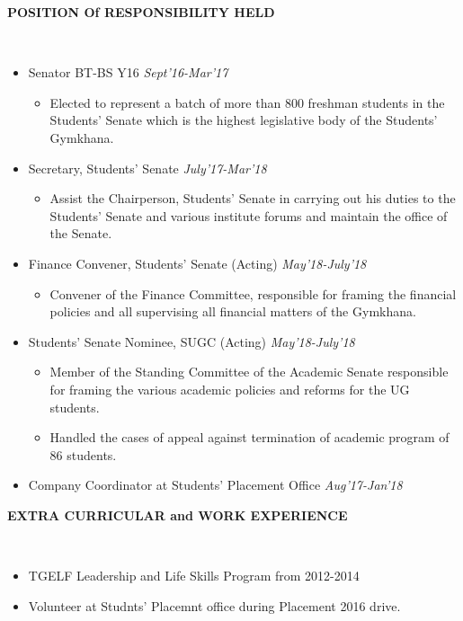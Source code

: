 \documentclass{article}
\newcommand{\isep}{-2 pt}
\newcommand{\lsep}{-0.5cm}
\newcommand{\resheading}[1]{{\small \colorbox{mygrey}{\begin{minipage}{0.975\textwidth}{\textbf{#1 \vphantom{p\^{E}}}}\end{minipage}}}}
\begin{document}
\resheading{\textbf{POSITION Of RESPONSIBILITY HELD} }\\[\lsep]
\begin{itemize}
\item \noindent Senator BT-BS Y16 \hskip 11.8cm \textit{Sept'16-Mar'17} \\[-0.6cm]
  	\begin{itemize}\itemsep \isep
  	\item Elected to represent a batch of more than 800 freshman students in the Students' Senate which is the highest legislative body of the Students' Gymkhana. 
  	\end{itemize}
\item \noindent Secretary, Students' Senate \hskip 10.5cm \textit{July'17-Mar'18} \\[-0.6cm]
    \begin{itemize}\itemsep \isep
  	\item Assist the Chairperson, Students' Senate in carrying out his duties to the Students' Senate and various institute forums and maintain the office of the Senate.
  	\end{itemize}
\item \noindent Finance Convener, Students' Senate (Acting)\hskip 7.9cm \textit{May'18-July'18} \\[-0.6cm]
     \begin{itemize}\itemsep \isep
  	\item Convener of the Finance Committee, responsible for framing the financial policies and all supervising all financial matters of the Gymkhana.
  	\end{itemize}
\item \noindent Students' Senate Nominee, SUGC (Acting) \hskip 8cm \textit{May'18-July'18} \\[-0.6cm]
     \begin{itemize}\itemsep \isep
  	\item Member of the Standing Committee of the Academic Senate responsible for framing the various academic policies and reforms for the UG students.
  	\item Handled the cases of appeal against termination of academic program of 86 students. 
  	\end{itemize}
\item \noindent Company Coordinator at Students’ Placement Office \hskip 6.6cm \textit{Aug'17-Jan'18}
\end{itemize}

\resheading{\textbf{EXTRA CURRICULAR and WORK EXPERIENCE} }\\[\lsep]
\begin{itemize}
\item \noindent TGELF Leadership and Life Skills Program from 2012-2014
\item \noindent Volunteer at Studnts' Placemnt office during Placement 2016 drive.
\end{itemize}
\end{document}
